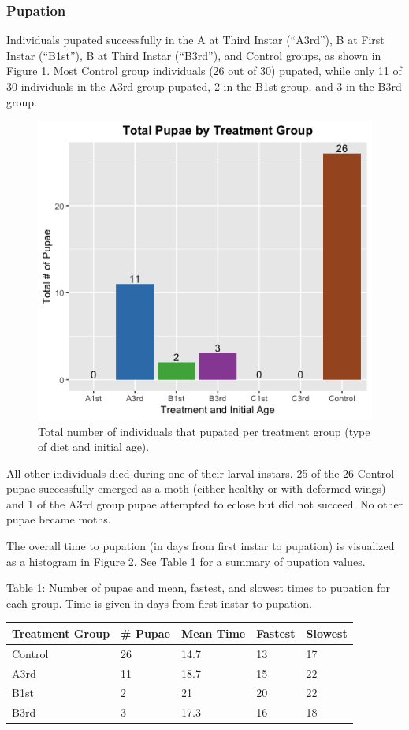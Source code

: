 \documentclass[12pt,]{article}
\begin{document}
\hypertarget{pupation-1}{%
\subsubsection{Pupation}\label{pupation-1}}

Individuals pupated successfully in the A at Third Instar (``A3rd''), B
at First Instar (``B1st''), B at Third Instar (``B3rd''), and Control
groups, as shown in Figure 1. Most Control group individuals (26 out of
30) pupated, while only 11 of 30 individuals in the A3rd group pupated,
2 in the B1st group, and 3 in the B3rd group.

\begin{figure}

{\centering \includegraphics[width=0.5\linewidth]{../Figures/Figure_1} 

}

\caption{Total number of individuals that pupated per treatment group (type of diet and initial age).}\label{fig:Figure1}
\end{figure}

All other individuals died during one of their larval instars. 25 of the
26 Control pupae successfully emerged as a moth (either healthy or with
deformed wings) and 1 of the A3rd group pupae attempted to eclose but
did not succeed. No other pupae became moths.

The overall time to pupation (in days from first instar to pupation) is
visualized as a histogram in Figure 2. See Table 1 for a summary of
pupation values.

Table 1: Number of pupae and mean, fastest, and slowest times to
pupation for each group. Time is given in days from first instar to
pupation.

\begin{longtable}[]{@{}lllll@{}}
\toprule\noalign{}
Treatment Group & \# Pupae & Mean Time & Fastest & Slowest \\
\midrule\noalign{}
\endhead
\bottomrule\noalign{}
\endlastfoot
Control & 26 & 14.7 & 13 & 17 \\
A3rd & 11 & 18.7 & 15 & 22 \\
B1st & 2 & 21 & 20 & 22 \\
B3rd & 3 & 17.3 & 16 & 18 \\
\end{longtable}
\end{document}

